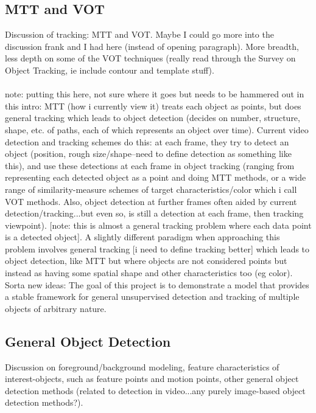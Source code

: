 \documentclass{article}
\begin{document}
\subsection*{MTT and VOT}
Discussion of tracking: MTT and VOT. Maybe I could go more into the discussion frank and I had here (instead of opening paragraph). More breadth, less depth on some of the VOT techniques (really read through the Survey on Object Tracking, ie include contour and template stuff). \\
\\
note: putting this here, not sure where it goes but needs to be hammered out in this intro: MTT (how i currently view it) treats each object as points, but does general tracking which leads to object detection (decides on number, structure, shape, etc. of paths, each of which represents an object over time). Current video detection and tracking schemes do this: at each frame, they try to detect an object (position, rough size/shape--need to define detection as something like this), and use these detections at each frame in object tracking (ranging from representing each detected object as a point and doing MTT methods, or a wide range of similarity-measure schemes of target characteristics/color which i call VOT methods. Also, object detection at further frames often aided by current detection/tracking...but even so, is still a detection at each frame, then tracking viewpoint). [note: this is almost a general tracking problem where each data point is a detected object]. A slightly different paradigm when approaching this problem involves general tracking [i need to define tracking better] which leads to object detection, like MTT but where objects are not considered points but instead as having some spatial shape and other characteristics too (eg color).
Sorta new ideas:
The goal of this project is to demonstrate a model that provides a stable framework for general unsupervised detection and tracking of multiple objects of arbitrary nature.

\subsection*{General Object Detection}
Discussion on foreground/background modeling, feature characteristics of interest-objects, such as feature points and motion points, other general object detection methods (related to detection in video...any purely image-based object detection methods?).
\end{document}
